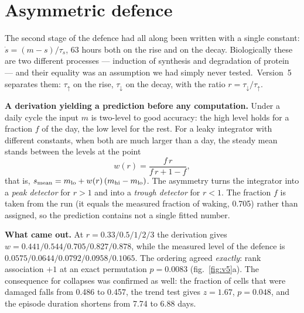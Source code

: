 \section{Asymmetric defence}\label{sec:asym}

The second stage of the defence had all along been written with a single constant: $\dot s=(m-s)/\tau_s$, 63 hours both on the rise and on the decay. Biologically these are two different processes --- induction of synthesis and degradation of protein --- and their equality was an assumption we had simply never tested.\tD\ Version~5 separates them: $\tau_{\uparrow}$ on the rise, $\tau_{\downarrow}$ on the decay, with the ratio $r=\tau_{\downarrow}/\tau_{\uparrow}$.

\textbf{A derivation yielding a prediction before any computation.} Under a daily cycle the input $m$ is two-level to good accuracy: the high level holds for a fraction $f$ of the day, the low level for the rest. For a leaky integrator with different constants, when both are much larger than a day, the steady mean stands between the levels at the point
\[w(r)=\frac{f\,r}{f\,r+1-f},\]
that is, $s_{\rm mean}=m_{\rm lo}+w(r)\,(m_{\rm hi}-m_{\rm lo})$. The asymmetry turns the integrator into a \emph{peak detector} for $r>1$ and into a \emph{trough detector} for $r<1$. The fraction $f$ is taken from the run (it equals the measured fraction of waking, 0.705) rather than assigned, so the prediction contains not a single fitted number.

\textbf{What came out.} At $r=0.33/0.5/1/2/3$ the derivation gives $w=0.441/0.544/0.705/0.827/0.878$, while the measured level of the defence is $0.0575/0.0644/0.0792/0.0958/0.1065$. The ordering agreed \emph{exactly}: rank association $+1$ at an exact permutation $p=0.0083$ (fig.~\ref{fig:v5}a). The consequence for collapses was confirmed as well: the fraction of cells that were damaged falls from 0.486 to 0.457, the trend test gives $z=1.67$, $p=0.048$, and the episode duration shortens from 7.74 to 6.88 days.

